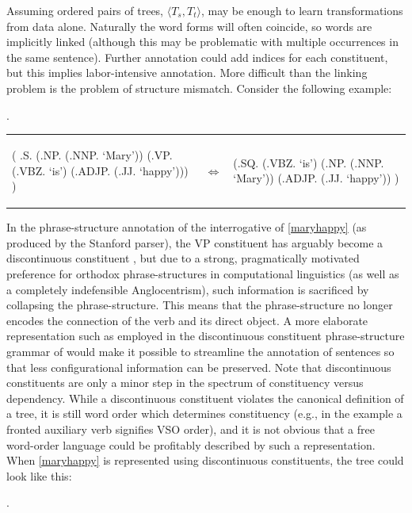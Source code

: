 \documentclass[a4paper]{article}
\theoremstyle{definition}
\begin{document}
Assuming ordered pairs of trees, $\langle T_{\mathit{s}},
T_{\mathit{t}} \rangle $, may be enough to learn transformations
from data alone. Naturally the word forms will often coincide, so words are
implicitly linked (although this may be problematic with multiple occurrences
in the same sentence). Further annotation could add indices for each
constituent, but this implies labor-intensive annotation. More difficult than
the linking problem is the problem of structure mismatch. Consider the following
example:

\ex. \label{maryhappy}

\begin{tabular}{lll}
\begin{parsetree}
( .S.
    (.NP. (.NNP. `Mary'))
    (.VP. (.VBZ. `is')
      (.ADJP. (.JJ. `happy')))
)
\end{parsetree}
& $\iff$ &
\begin{parsetree}
  (.SQ. 
    (.VBZ. `is')
    (.NP. (.NNP. `Mary'))
    (.ADJP. (.JJ. `happy'))
    )
\end{parsetree}
\end{tabular}
\vspace{1em}

In the phrase-structure annotation of the interrogative of \ref{maryhappy} (as produced
by the Stanford parser), the \textsc{VP} constituent has arguably become a
discontinuous constituent \cite{Ha}, but due to a strong, pragmatically
motivated preference for orthodox phrase-structures in computational linguistics (as
well as a completely indefensible Anglocentrism), such
information is sacrificed by collapsing the phrase-structure. This means that
the phrase-structure no longer encodes the connection of the verb and its
direct object. A more elaborate representation such as employed in the discontinuous
constituent phrase-structure grammar of \cite{Ha} would make it possible to streamline
the annotation of sentences so that less configurational information can be preserved.
Note that discontinuous constituents are only a minor step in the spectrum of
constituency versus dependency. While a discontinuous constituent violates the
canonical definition of a tree, it is still word order which determines constituency
(e.g., in the example a fronted auxiliary verb signifies VSO order),
and it is not obvious that a free word-order language could be profitably
described by such a representation. When \ref{maryhappy} is represented using
discontinuous constituents, the tree could look like this:

\ex. \label{marydiscont}
\end{document}
